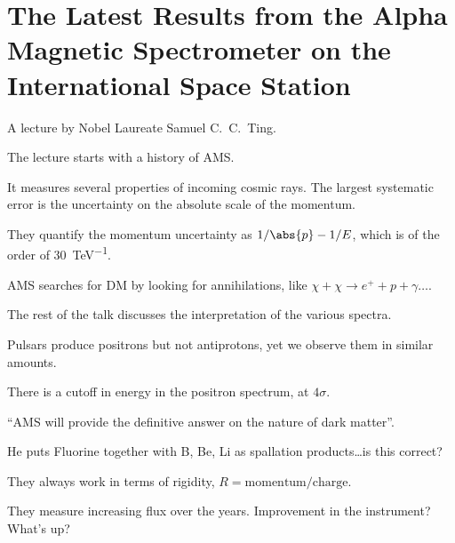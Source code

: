 \documentclass[main.tex]{subfiles}
\begin{document}
\section{The Latest Results from the Alpha Magnetic Spectrometer on the International Space Station}


A lecture by Nobel Laureate Samuel C.\ C.\ Ting.

The lecture starts with a history of AMS. 

It measures several properties of incoming cosmic rays. 
The largest systematic error is the uncertainty on the absolute scale of the momentum. 

They quantify the momentum uncertainty as \(1/ \abs{p} - 1 / E\), which is of the order of \SI{30}{TeV^{-1}}. 


AMS searches for DM by looking for annihilations, like \(\chi + \chi \to e^{+} + p + \gamma \dots\). 

The rest of the talk discusses the interpretation of the various spectra. 

Pulsars produce positrons but not antiprotons, yet we observe them in similar amounts. 

There is a cutoff in energy in the positron spectrum, at \(4 \sigma \). 

``AMS will provide the definitive answer on the nature of dark matter''.


He puts Fluorine together with B, Be, Li as spallation products\dots is this correct? 

They always work in terms of rigidity, \(R = \text{momentum} / \text{charge}\).

They measure increasing flux over the years.
Improvement in the instrument? What's up?
\end{document}
